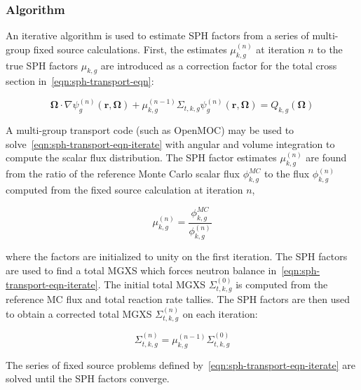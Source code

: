 \subsubsection{Algorithm}
\label{subsubsec:sph-algorithm}

An iterative algorithm is used to estimate SPH factors from a series of multi-group fixed source calculations. First, the estimates $\mu_{k,g}^{(n)}$ at iteration $n$ to the true SPH factors $\mu_{k,g}$ are introduced as a correction factor for the total cross section in~\autoref{eqn:sph-transport-eqn}:

\begin{dmath}
\label{eqn:sph-transport-eqn-iterate}
\mathbf{\Omega} \cdot \nabla \psi_{g}^{(n)}(\mathbf{r},\mathbf{\Omega}) + \mu_{k,g}^{(n-1)}\Sigma_{t,k,g}\psi_{g}^{(n)}(\mathbf{r},\mathbf{\Omega}) = Q_{k,g}(\mathbf{\Omega})
\end{dmath}

\noindent A multi-group transport code (such as OpenMOC) may be used to solve~\autoref{eqn:sph-transport-eqn-iterate} with angular and volume integration to compute the scalar flux distribution. The SPH factor estimates $\mu_{k,g}^{(n)}$ are found from the ratio of the reference Monte Carlo scalar flux $\phi_{k,g}^{MC}$ to the flux $\phi_{k,g}^{(n)}$ computed from the fixed source calculation at iteration $n$,

\begin{equation}
\label{eqn:sph-update}
\mu_{k,g}^{(n)} = \frac{\phi_{k,g}^{MC}}{\phi_{k,g}^{(n)}}
\end{equation}

\noindent where the factors are initialized to unity on the first iteration. The SPH factors are used to find a total MGXS which forces neutron balance in~\autoref{eqn:sph-transport-eqn-iterate}. The initial total MGXS $\Sigma_{t,k,g}^{(0)}$ is computed from the reference MC flux and total reaction rate tallies. The SPH factors are then used to obtain a corrected total MGXS $\Sigma_{t,k,g}^{(n)}$ on each iteration:

\begin{dmath}
\label{eqn:sph-update-sigt}
\Sigma_{t,k,g}^{(n)} = \mu_{k,g}^{(n-1)}\Sigma_{t,k,g}^{(0)}
\end{dmath}

The series of fixed source problems defined by~\autoref{eqn:sph-transport-eqn-iterate} are solved until the SPH factors converge.

